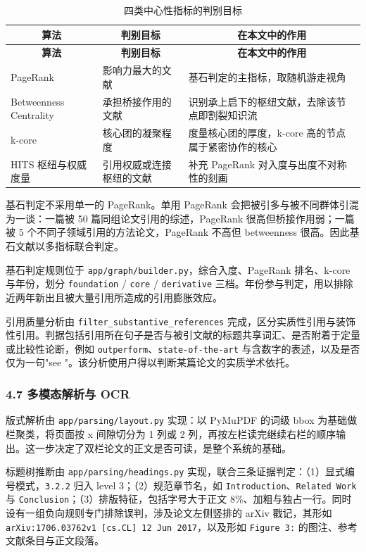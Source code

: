 \documentclass[UTF8,fontset=windows,zihao=5,a4paper]{ctexart}
\begin{document}
\begin{longtable}{@{}p{}p{}p{}@{}}
\caption{四类中心性指标的判别目标}\\
\toprule
\multicolumn{1}{c}{\textbf{算法}} & \multicolumn{1}{c}{\textbf{判别目标}} & \multicolumn{1}{c}{\textbf{在本文中的作用}} \\
\midrule
\endfirsthead
\toprule
\multicolumn{1}{c}{\textbf{算法}} & \multicolumn{1}{c}{\textbf{判别目标}} & \multicolumn{1}{c}{\textbf{在本文中的作用}} \\
\midrule
\endhead
\bottomrule
\endfoot
PageRank & 影响力最大的文献 & 基石判定的主指标，取随机游走视角 \\
Betweenness Centrality & 承担桥接作用的文献 & 识别承上启下的枢纽文献，去除该节点即割裂知识流 \\
k-core & 核心团的凝聚程度 & 度量核心团的厚度，k-core 高的节点属于紧密协作的核心 \\
HITS 枢纽与权威度量 & 引用权威或连接枢纽的文献 & 补充 PageRank 对入度与出度不对称性的刻画 \\
\end{longtable}

基石判定不采用单一的 PageRank。单用 PageRank 会把被引多与被不同群体引混为一谈：一篇被 50 篇同组论文引用的综述，PageRank 很高但桥接作用弱；一篇被 5 个不同子领域引用的方法论文，PageRank 不高但 betweenness 很高。因此基石文献以多指标联合判定。

基石判定规则位于 \texttt{app/graph/builder.py}，综合入度、PageRank 排名、k-core 与年份，划分 \texttt{foundation} / \texttt{core} / \texttt{derivative} 三档。年份参与判定，用以排除近两年新出且被大量引用所造成的引用膨胀效应。

引用质量分析由 \texttt{filter\_\allowbreak{}substantive\_\allowbreak{}references} 完成，区分实质性引用与装饰性引用。判据包括引用所在句子是否与被引文献的标题共享词汇、是否附着于定量或比较性论断，例如 \texttt{outperform}、\texttt{state-of-the-art} 与含数字的表述，以及是否仅为一句"see \cite{ref12}"。该分析使用户得以判断某篇论文的实质学术依托。

\subsubsection*{4.7 多模态解析与 OCR}
版式解析由 \texttt{app/parsing/layout.py} 实现：以 PyMuPDF 的词级 bbox 为基础做栏聚类，将页面按 x 间隙切分为 1 列或 2 列，再按左栏读完继续右栏的顺序输出。这一步决定了双栏论文的正文是否可读，是整个系统的基础。

标题树推断由 \texttt{app/parsing/headings.py} 实现，联合三条证据判定：（1）显式编号模式，\texttt{3.2.2} 归入 level 3；（2）规范章节名，如 \texttt{Introduction}、\texttt{Related Work} 与 \texttt{Conclusion}；（3）排版特征，包括字号大于正文 8\%、加粗与独占一行。同时设有一组负向规则专门排除误判，涉及论文左侧竖排的 arXiv 戳记，其形如 \texttt{arXiv:1706.03762v1 [cs.CL] 12 Jun 2017}，以及形如 \texttt{Figure 3:} 的图注、参考文献条目与正文段落。
\end{document}
